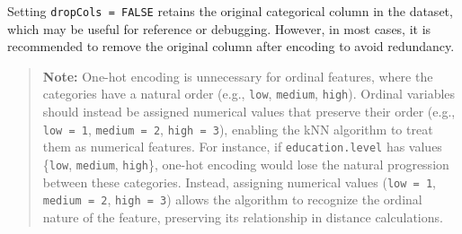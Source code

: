 \documentclass[
  11pt,
]{book}
\makeatletter
\newenvironment{Shaded}{}{}
\newcommand{\DecValTok}[1]{#1}
\newcommand{\NormalTok}[1]{#1}
\newcommand{\SpecialCharTok}[1]{\textcolor[rgb]{0.39,0.39,0.39}{#1}}
\newcommand{\StringTok}[1]{\textcolor[rgb]{0.39,0.39,0.39}{#1}}
\renewenvironment{quote}{\begin{quotation}}{\end{quotation}}
\newenvironment{kframe}{%
\medskip{}
\setlength{\fboxsep}{.8em}
 \def\at@end@of@kframe{}%
 \ifinner\ifhmode%
  \def\at@end@of@kframe{\end{minipage}}%
  \begin{minipage}{\columnwidth}%
 \fi\fi%
 \def\FrameCommand##1{\hskip\@totalleftmargin \hskip-\fboxsep
 \colorbox{shadecolor}{##1}\hskip-\fboxsep
     \hskip-\linewidth \hskip-\@totalleftmargin \hskip\columnwidth}%
 \MakeFramed {\advance\hsize-\width
   \@totalleftmargin\z@ \linewidth\hsize
   \@setminipage}}%
 {\par\unskip\endMakeFramed%
 \at@end@of@kframe}
\renewenvironment{Shaded}{\begin{kframe}}{\end{kframe}}
\theoremstyle{definition}
\theoremstyle{definition}
\theoremstyle{definition}
\theoremstyle{definition}
\theoremstyle{remark}
\makeatother
\begin{document}
\begin{Shaded}
\end{Shaded}

Setting \texttt{dropCols\ =\ FALSE} retains the original categorical column in the dataset, which may be useful for reference or debugging. However, in most cases, it is recommended to remove the original column after encoding to avoid redundancy.

\begin{quote}
\textbf{Note:} One-hot encoding is unnecessary for ordinal features, where the categories have a natural order (e.g., \texttt{low}, \texttt{medium}, \texttt{high}). Ordinal variables should instead be assigned numerical values that preserve their order (e.g., \texttt{low\ =\ 1}, \texttt{medium\ =\ 2}, \texttt{high\ =\ 3}), enabling the kNN algorithm to treat them as numerical features. For instance, if \texttt{education.level} has values \{\texttt{low}, \texttt{medium}, \texttt{high}\}, one-hot encoding would lose the natural progression between these categories. Instead, assigning numerical values (\texttt{low\ =\ 1}, \texttt{medium\ =\ 2}, \texttt{high\ =\ 3}) allows the algorithm to recognize the ordinal nature of the feature, preserving its relationship in distance calculations.
\end{quote}
\end{document}
